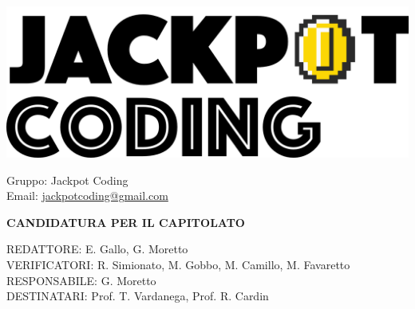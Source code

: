 \documentclass[5pt]{article}
\begin{document}
\begin{minipage}[t]{0.50\textwidth}
    \begin{flushleft}
        \hspace{10pt}
        \includegraphics[scale=0.65]{assets/jackpot-logo.png} 
    \end{flushleft}
\end{minipage}
\hspace{-60pt} %
\begin{flushright}
    \begin{minipage}[t]{0.50\textwidth}
        \begin{flushright}
            Gruppo: {\Large Jackpot Coding}\\
            Email: \href{mailto:jackpotcoding@gmail.com}{jackpotcoding@gmail.com}
        \end{flushright}
    \end{minipage}
\end{flushright}

\vspace{24pt}

\begin{center}
    \textbf{\LARGE CANDIDATURA PER IL CAPITOLATO}
\end{center}

\vspace{13pt}

\begin{flushleft}
    \begin{spacing}{1.5}
        REDATTORE: E. Gallo, G. Moretto\\%
        VERIFICATORI: R. Simionato, M. Gobbo, M. Camillo, M. Favaretto \\
        RESPONSABILE: G. Moretto\\%
        \vspace{7pt}
        DESTINATARI: Prof. T. Vardanega, Prof. R. Cardin\\%
    \end{spacing}
\end{flushleft}
\end{document}
